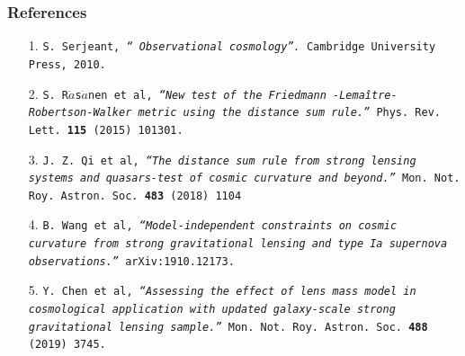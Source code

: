 \documentclass[xcolor=table,bigger]{beamer}
\begin{document}
\begin{frame}
 \frametitle{References}
 \begin{itemize}
 \item[1.]
 {\texttt {S. Serjeant, \emph{`` Observational cosmology''.} Cambridge University Press, 2010.}}
 \vspace{2mm}\\
 \item[2.]
{\texttt {S. R$\ddot{a}$s$\ddot{a}$nen et al, \emph{``New test of the Friedmann -Lema\^{i}tre-Robertson-Walker metric using the distance sum rule.''}  Phys. Rev. Lett. \textbf{115} (2015) 101301.}}
  \vspace{2mm}\\

 \item[3.]
{\texttt {J. Z. Qi et al, \emph{``The distance sum rule from strong lensing systems and quasars-test of cosmic curvature and beyond.''}  Mon. Not. Roy. Astron. Soc. \textbf{483} (2018) 1104}}
 \vspace{2mm}\\

\item[4.]
{\texttt {B. Wang et al, \emph{``Model-independent constraints on cosmic curvature from strong gravitational lensing and type Ia supernova observations.''} arXiv:1910.12173.}}
 \vspace{2mm}\\

\item[5.]
{\texttt {Y. Chen et al, \emph{``Assessing the effect of lens mass model in cosmological application with updated galaxy-scale strong gravitational lensing sample.''}  Mon. Not. Roy. Astron. Soc. \textbf{488} (2019) 3745.}}
\end{itemize}
 \end{frame}
\end{document}

